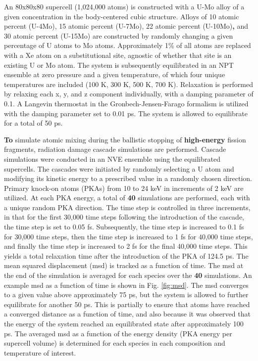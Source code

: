 \documentclass[review]{elsarticle}
\providecommand{\DIFaddtex}[1]{{\bf #1}} %
\providecommand{\DIFdeltex}[1]{} %
\providecommand{\DIFaddbegin}{\protect\color{blue}} %
\providecommand{\DIFaddend}{\protect\color{black}} %
\providecommand{\DIFdelbegin}{\protect\color{red}} %
\providecommand{\DIFdelend}{\protect\color{black}} %
\providecommand{\DIFadd}[1]{\texorpdfstring{\DIFaddtex{#1}}{#1}} %
\providecommand{\DIFdel}[1]{\texorpdfstring{\DIFdeltex{#1}}{}} %
\newcommand{\DIFscaledelfig}{0.5}
\newlength{\DIFdelgraphicswidth} %
\newlength{\DIFdelgraphicsheight} %
\newcommand{\DIFaddincludegraphics}[2][]{{\color{blue}\fbox{\DIFOincludegraphics[#1]{#2}}}} %
\newcommand{\DIFdelincludegraphics}[2][]{%
\sbox{\DIFdelgraphicsbox}{\DIFOincludegraphics[#1]{#2}}%
\settoboxwidth{\DIFdelgraphicswidth}{\DIFdelgraphicsbox} %
\settoboxtotalheight{\DIFdelgraphicsheight}{\DIFdelgraphicsbox} %
\scalebox{\DIFscaledelfig}{%
\parbox[b]{\DIFdelgraphicswidth}{\usebox{\DIFdelgraphicsbox}\\[-\baselineskip] \rule{\DIFdelgraphicswidth}{0em}}\llap{\resizebox{\DIFdelgraphicswidth}{\DIFdelgraphicsheight}{%
\setlength{\unitlength}{\DIFdelgraphicswidth}%
\begin{picture}(1,1)%
\thicklines\linethickness{2pt} %
{\color[rgb]{1,0,0}\put(0,0){\framebox(1,1){}}}%
{\color[rgb]{1,0,0}\put(0,0){\line( 1,1){1}}}%
{\color[rgb]{1,0,0}\put(0,1){\line(1,-1){1}}}%
\end{picture}%
}\hspace*{3pt}}} %
} %
\DeclareRobustCommand{\DIFaddbegin}{\DIFOaddbegin \let\includegraphics\DIFaddincludegraphics} %
\DeclareRobustCommand{\DIFaddend}{\DIFOaddend \let\includegraphics\DIFOincludegraphics} %
\DeclareRobustCommand{\DIFdelbegin}{\DIFOdelbegin \let\includegraphics\DIFdelincludegraphics} %
\DeclareRobustCommand{\DIFdelend}{\DIFOaddend \let\includegraphics\DIFOincludegraphics} %
\begin{document}
An 80x80x80 supercell (1,024,000 atoms) is constructed with a U-Mo alloy of a given concentration in the body-centered cubic structure. Alloys of 10 atomic percent (U-4Mo), 15 atomic percent (U-7Mo), 22 atomic percent (U-10Mo)\DIFaddbegin \DIFadd{, }\DIFaddend and 30 atomic percent (U-15Mo) are constructed by randomly changing a given percentage of U atoms to Mo atoms. Approximately 1\% of all atoms are replaced with a Xe atom on a substitutional site, agnostic of whether that site is an existing U or Mo atom. The system is subsequently equilibrated in an NPT ensemble at zero pressure and a given temperature, of which four unique temperatures are included (100 K, 300 K, 500 K, 700 K). Relaxation is performed by relaxing each x, y, and z component individually, with a damping parameter of 0.1. A Langevin thermostat in the Gronbech-Jensen-Farago \cite{gjf2013, gjf2014} formalism is utilized with the damping parameter set to 0.01 ps. The system is allowed to equilibrate for a total of 50 ps.

\DIFdelbegin \DIFdel{In order to }\DIFdelend \DIFaddbegin \DIFadd{To }\DIFaddend simulate atomic mixing during the ballistic stopping of \DIFdelbegin \DIFdel{high energy }\DIFdelend \DIFaddbegin \DIFadd{high-energy }\DIFaddend fission fragments, radiation damage cascade simulations are performed. Cascade simulations were conducted in an NVE ensemble using the equilibrated supercells. The cascades were initiated by randomly selecting a U atom and modifying its kinetic energy to a prescribed value in a randomly chosen direction. Primary knock-on atoms (PKAs) from 10 \DIFdelbegin \DIFdel{keV }\DIFdelend to 24 keV in increments of 2 keV are utilized. At each PKA energy, a total of \DIFdelbegin \DIFdel{forty }\DIFdelend \DIFaddbegin \DIFadd{40 }\DIFaddend simulations are performed, each with a unique random PKA direction. The time step is controlled in three increments, in that for the first 30,000 time steps following the introduction of the cascade, the time step is set to 0.05 fs. Subsequently, the time step is increased to 0.1 fs for 30,000 time steps, then the time step is increased to 1 fs for 40,000 time steps, and finally the time step is increased to 2 fs for the final 40,000 time steps. This yields a total relaxation time after the introduction of the PKA of 124.5 ps. The mean squared displacement (msd) is tracked as a function of time. The msd at the end of the simulation is averaged for each species over the \DIFdelbegin \DIFdel{twenty }\DIFdelend \DIFaddbegin \DIFadd{40 }\DIFaddend simulations. An example msd as a function of time is shown in Fig. \ref{fig:msd}. The msd converges to a given value above approximately 75 ps, but the system is allowed to further equilibrate for another 50 ps. This is partially to ensure that atoms have reached a converged distance as a function of time, and also because it was observed that the energy of the system reached an equilibrated state after approximately 100 ps. The averaged msd as a function of the energy density (PKA energy per supercell volume) is determined for each species in each composition and temperature of interest. 
\end{document}
